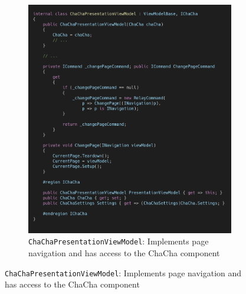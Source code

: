 \begin{figure}
\centering
\begin{subfigure}[t]{\textwidth}
\centering
\includegraphics[width=\textwidth]{figures/code/mvvm-arch/chachaPresentationViewModel.png}
\caption{\texttt{ChaChaPresentationViewModel}: Implements page navigation and has access to the ChaCha component}\label{fig:mvvm.chachapresentationviewmodel}
\end{subfigure}
\end{figure}

